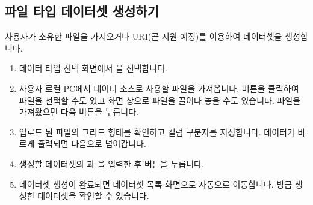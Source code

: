 \documentclass[letterpaper,10pt,english]{sphinxmanual}
\begin{document}
\subsection{파일 타입 데이터셋 생성하기}
\label{\detokenize{discovery/part07/create_a_dataset:create-a-dataset-of-file}}\label{\detokenize{discovery/part07/create_a_dataset:id2}}
사용자가 소유한 파일을 가져오거나 URI(곧 지원 예정)를 이용하여 데이터셋을 생성합니다.
\begin{enumerate}
\def\theenumi{\arabic{enumi}}
\def\labelenumi{\theenumi .}
\makeatletter\def\p@enumii{\p@enumi \theenumi .}\makeatother
\item {} 
데이터 타입 선택 화면에서 을 선택합니다.

\item {} 
사용자 로컬 PC에서 데이터 소스로 사용할 파일을 가져옵니다.  버튼을 클릭하여 파일을 선택할 수도 있고 화면 상으로 파일을 끌어다 놓을 수도 있습니다. 파일을 가져왔으면 다음 버튼을 누릅니다.
\begin{quote}

\begin{figure}[H]
\centering

\noindent{}
\end{figure}
\end{quote}

\item {} 
업로드 된 파일의 그리드 형태를 확인하고 컬럼 구분자를 지정합니다. 데이터가 바르게 출력되면 다음으로 넘어갑니다.
\begin{quote}

\begin{figure}[H]
\centering

\noindent{}
\end{figure}
\end{quote}

\item {} 
생성할 데이터셋의 과 을 입력한 후  버튼을 누릅니다.
\begin{quote}

\begin{figure}[H]
\centering

\noindent{}
\end{figure}
\end{quote}

\item {} 
데이터셋 생성이 완료되면 데이터셋 목록 화면으로 자동으로 이동합니다. 방금 생성한 데이터셋을 확인할 수 있습니다.
\begin{quote}

\begin{figure}[H]
\centering

\noindent{}
\end{figure}
\end{quote}

\end{enumerate}
\end{document}
